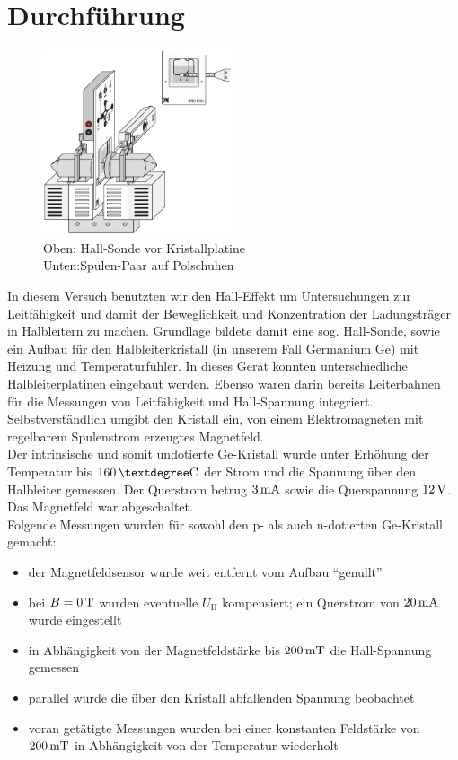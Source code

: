 \documentclass[numbers=noenddot,14pt,a4paper]{scrartcl}
\newcommand{\ix}[1]{_\text{#1}}
\begin{document}
\section{Durchführung}
\begin{figure}
	\centering
	\includegraphics[width=0.5\textwidth]{aufbau.png}
	\caption{Oben: Hall-Sonde vor Kristallplatine\\Unten:Spulen-Paar auf Polschuhen}
\end{figure}
In diesem Versuch benutzten wir den Hall-Effekt um Untersuchungen zur Leitfähigkeit und damit der Beweglichkeit und Konzentration der Ladungsträger in Halbleitern zu machen. Grundlage bildete damit eine sog. Hall-Sonde, sowie ein Aufbau für den Halbleiterkristall (in unserem Fall Germanium Ge) mit Heizung und Temperaturfühler. In dieses Gerät konnten unterschiedliche Halbleiterplatinen eingebaut werden. Ebenso waren darin bereits Leiterbahnen für die Messungen von Leitfähigkeit und Hall-Spannung integriert. Selbstverständlich umgibt den Kristall ein, von einem Elektromagneten mit regelbarem Spulenstrom erzeugtes Magnetfeld.\\
Der intrinsische und somit undotierte Ge-Kristall wurde unter Erhöhung der Temperatur bis $\unit[160]{°C}$ der Strom und die Spannung über den Halbleiter gemessen. Der Querstrom betrug $\unit[3]{mA}$ sowie die Querspannung $\unit[12]{V}$. Das Magnetfeld war abgeschaltet.\\
Folgende Messungen wurden für sowohl den p- als auch n-dotierten Ge-Kristall gemacht:
\begin{itemize}
	\item{der Magnetfeldsensor wurde weit entfernt vom Aufbau "`genullt"'}
	\item{bei $B=\unit[0]{T}$ wurden eventuelle $U\ix{H}$ kompensiert; ein Querstrom von $\unit[20]{mA}$ wurde eingestellt}
	\item{in Abhängigkeit von der Magnetfeldstärke bis $\unit[200]{mT}$ die Hall-Spannung gemessen}
	\item{parallel wurde die über den Kristall abfallenden Spannung beobachtet}
	\item{voran getätigte Messungen wurden bei einer konstanten Feldstärke von $\unit[200]{mT}$ in Abhängigkeit von der Temperatur wiederholt}
\end{itemize}
\end{document}
